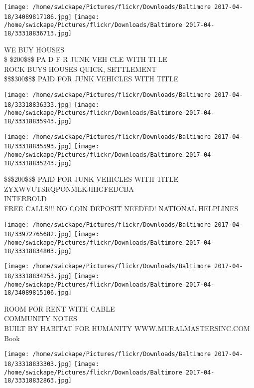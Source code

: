 \documentclass[10pt,letterpaper]{article}
\begin{document}
\texttt{[image: /home/swickape/Pictures/flickr/Downloads/Baltimore 2017-04-18/34089817186.jpg]}
\texttt{[image: /home/swickape/Pictures/flickr/Downloads/Baltimore 2017-04-18/33318836713.jpg]}

WE BUY HOUSES\\
\$ \$200\$\$\$ PA D F R JUNK VEH CLE WITH TI LE\\
ROCK BUYS HOUSES QUICK, SETTLEMENT\\
\$\$\$300\$\$\$ PAID FOR JUNK VEHICLES WITH TITLE\\
\pagebreak

\texttt{[image: /home/swickape/Pictures/flickr/Downloads/Baltimore 2017-04-18/33318836333.jpg]}
\texttt{[image: /home/swickape/Pictures/flickr/Downloads/Baltimore 2017-04-18/33318835943.jpg]}

\texttt{[image: /home/swickape/Pictures/flickr/Downloads/Baltimore 2017-04-18/33318835593.jpg]}
\texttt{[image: /home/swickape/Pictures/flickr/Downloads/Baltimore 2017-04-18/33318835243.jpg]}

\$\$\$200\$\$\$ PAID FOR JUNK VEHICLES WITH TITLE\\
ZYXWVUTSRQPONMLKJIHGFEDCBA\\
INTERBOLD\\
FREE CALLS!!! NO COIN DEPOSIT NEEDED!  NATIONAL HELPLINES\\
\pagebreak

\texttt{[image: /home/swickape/Pictures/flickr/Downloads/Baltimore 2017-04-18/33972765682.jpg]}
\texttt{[image: /home/swickape/Pictures/flickr/Downloads/Baltimore 2017-04-18/33318834803.jpg]}

\texttt{[image: /home/swickape/Pictures/flickr/Downloads/Baltimore 2017-04-18/33318834253.jpg]}
\texttt{[image: /home/swickape/Pictures/flickr/Downloads/Baltimore 2017-04-18/34089815106.jpg]}

ROOM FOR RENT WITH CABLE\\
COMMUNITY NOTES\\
BUILT BY HABITAT FOR HUMANITY WWW.MURALMASTERSINC.COM\\
Book\\
\pagebreak

\texttt{[image: /home/swickape/Pictures/flickr/Downloads/Baltimore 2017-04-18/33318833303.jpg]}
\texttt{[image: /home/swickape/Pictures/flickr/Downloads/Baltimore 2017-04-18/33318832863.jpg]}
\end{document}
